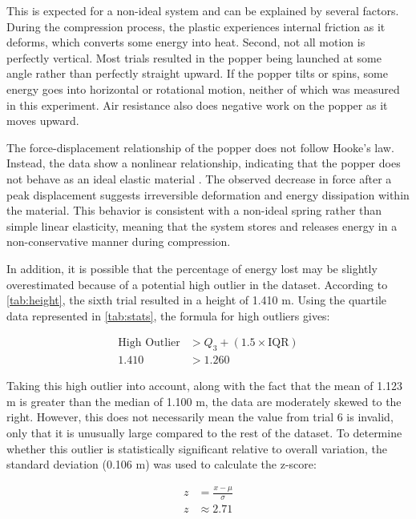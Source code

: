 \documentclass[amsmath,amssymb,aps,endfloats,linenumbers]{revtex4-2}
\begin{document}
This is expected for a non-ideal system and can be explained by several factors. During the compression process, the plastic experiences internal friction as it deforms, which converts some energy into heat. Second, not all motion is perfectly vertical. Most trials resulted in the popper being launched at some angle rather than perfectly straight upward. If the popper tilts or spins, some energy goes into horizontal or rotational motion, neither of which was measured in this experiment. Air resistance also does negative work on the popper as it moves upward.

The force-displacement relationship of the popper does not follow Hooke’s law. Instead, the data show a nonlinear relationship, indicating that the popper does not behave as an ideal elastic material \cite{rohland_hookslaw}. The observed decrease in force after a peak displacement suggests irreversible deformation and energy dissipation within the material. This behavior is consistent with a non-ideal spring rather than simple linear elasticity, meaning that the system stores and releases energy in a non-conservative manner during compression.

In addition, it is possible that the percentage of energy lost may be slightly overestimated because of a potential high outlier in the dataset. According to \cref{tab:height}, the sixth trial resulted in a height of 1.410 m. Using the quartile data represented in \cref{tab:stats}, the formula for high outliers gives:

\begin{equation}
\begin{aligned}
\text{High Outlier} &> Q_3 + (1.5 \times \text{IQR}) \\
1.410 &> 1.260
\end{aligned}
\end{equation}

Taking this high outlier into account, along with the fact that the mean of 1.123 m is greater than the median of 1.100 m, the data are moderately skewed to the right. However, this does not necessarily mean the value from trial 6 is invalid, only that it is unusually large compared to the rest of the dataset. To determine whether this outlier is statistically significant relative to overall variation, the standard deviation (0.106 m) was used to calculate the z-score:

\begin{equation}
\begin{aligned}
z &= \frac{x-\mu}{\sigma} \\
z &\approx 2.71
\end{aligned}
\end{equation}
\end{document}
